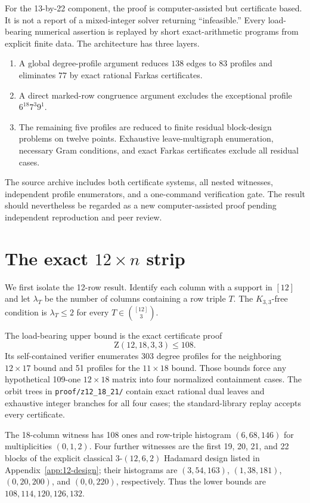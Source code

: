 \documentclass[11pt]{amsart}
\newcommand{\Z}{\mathrm Z}
\begin{document}
For the 13-by-22 component, the proof is computer-assisted but certificate based. It is not a report of a mixed-integer solver returning ``infeasible.'' Every load-bearing numerical assertion is replayed by short exact-arithmetic programs from explicit finite data. The architecture has three layers.

\begin{enumerate}[label=(\roman*)]
\item A global degree-profile argument reduces $138$ edges to $83$ profiles and eliminates $77$ by exact rational Farkas certificates.
\item A direct marked-row congruence argument excludes the exceptional profile $6^{18}7^3 9^1$.
\item The remaining five profiles are reduced to finite residual block-design problems on twelve points. Exhaustive leave-multigraph enumeration, necessary Gram conditions, and exact Farkas certificates exclude all residual cases.
\end{enumerate}

The source archive includes both certificate systems, all nested witnesses, independent profile enumerators, and a one-command verification gate. The result should nevertheless be regarded as a new computer-assisted proof pending independent reproduction and peer review.

\section{The exact $12\times n$ strip}
\label{sec:12-strip}

We first isolate the 12-row result. Identify each column with a support in
$[12]$ and let $\lambda_T$ be the number of columns containing a row triple
$T$. The $K_{3,3}$-free condition is $\lambda_T\le2$ for every
$T\in\binom{[12]}3$.

The load-bearing upper bound is the exact certificate proof
\[
  \Z(12,18,3,3)\le108.
\]
Its self-contained verifier enumerates 303 degree profiles for the neighboring
$12\times17$ bound and 51 profiles for the $11\times18$ bound. Those bounds
force any hypothetical 109-one $12\times18$ matrix into four normalized
containment cases. The orbit trees in \texttt{proof/z12\_18\_21/} contain exact
rational dual leaves and exhaustive integer branches for all four cases; the
standard-library replay accepts every certificate.

The 18-column witness has 108 ones and row-triple histogram
$(6,68,146)$ for multiplicities $(0,1,2)$. Four further witnesses are the
first 19, 20, 21, and 22 blocks of the explicit classical 3-$(12,6,2)$
Hadamard design listed in Appendix~\ref{app:12-design}; their histograms are
$(3,54,163)$, $(1,38,181)$, $(0,20,200)$, and $(0,0,220)$, respectively.
Thus the lower bounds are $108,114,120,126,132$.
\end{document}
